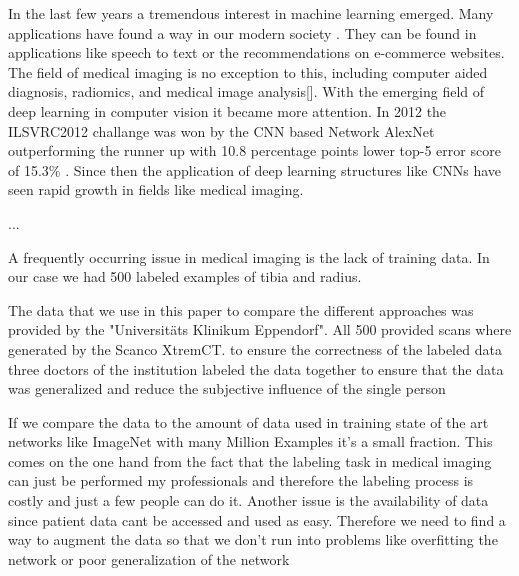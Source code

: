 \documentclass[
a4paper, 
12pt,
grayscalebody, %
abstract=on,
twoside, BCOR10mm, 12pt, DIV13,headinclude, footexclude, final, abstracton, openright
]{ibireprt}
\numberwithin{equation}{chapter}
\numberwithin{table}{chapter}
\numberwithin{figure}{chapter}
\numberwithin{algorithm}{chapter}
\numberwithin{example}{chapter}
\numberwithin{example}{chapter}
\begin{document}
In the last few years a tremendous interest in machine learning emerged. Many applications have found a way in our modern society \cite{LeCun2015}. They can be found in applications like speech to text or the recommendations on e-commerce websites. The field of medical imaging is no exception to this, including computer aided diagnosis, radiomics, and medical image analysis[]. With the emerging field of deep learning in computer vision it became more attention. In 2012 the ILSVRC2012 challange  was won by the CNN based Network AlexNet outperforming the runner up with 10.8 percentage points lower top-5 error score of 15.3\% . Since then the application of deep learning structures like CNNs have seen rapid growth in fields like medical imaging. 

 ...\cite{Yamashita2018} %

A frequently occurring issue in medical imaging is the lack of training data. In our case we had 500 labeled examples of tibia and radius.

The data that we use in this paper to compare the different approaches was provided by the "Universitäts Klinikum Eppendorf". All 500 provided scans where generated by the Scanco XtremCT.%
to ensure the correctness of the labeled data three doctors of the institution labeled the data together to ensure that the data was generalized and reduce the subjective influence of the single person  

 If we compare the data to the amount of data used in training state of the art networks like ImageNet with many Million Examples it's a small fraction. This comes on the one hand from the fact that the labeling task in medical imaging can just be performed my professionals and therefore the labeling process is costly and just a few people can do it. Another issue is the availability of data since patient data cant be accessed and used as easy. Therefore we need to find a way to augment the data so that we don't run into problems like overfitting the network or poor generalization of the network 
  
\end{document}
